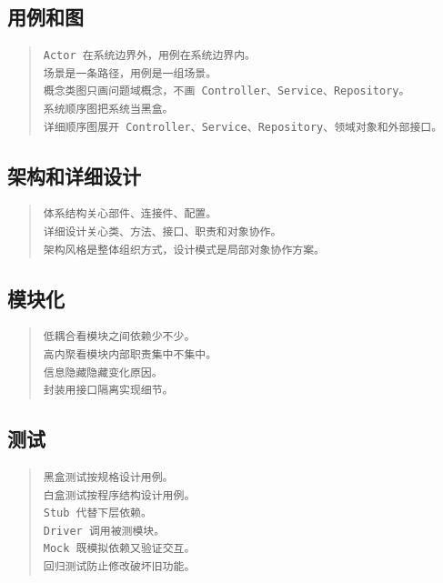 \documentclass[UTF8,zihao=-4]{ctexart}
\begin{document}
\subsection{用例和图}


\begin{quote}
\footnotesize
\begin{verbatim}
Actor 在系统边界外，用例在系统边界内。
场景是一条路径，用例是一组场景。
概念类图只画问题域概念，不画 Controller、Service、Repository。
系统顺序图把系统当黑盒。
详细顺序图展开 Controller、Service、Repository、领域对象和外部接口。
\end{verbatim}
\end{quote}


\subsection{架构和详细设计}


\begin{quote}
\footnotesize
\begin{verbatim}
体系结构关心部件、连接件、配置。
详细设计关心类、方法、接口、职责和对象协作。
架构风格是整体组织方式，设计模式是局部对象协作方案。
\end{verbatim}
\end{quote}


\subsection{模块化}


\begin{quote}
\footnotesize
\begin{verbatim}
低耦合看模块之间依赖少不少。
高内聚看模块内部职责集中不集中。
信息隐藏隐藏变化原因。
封装用接口隔离实现细节。
\end{verbatim}
\end{quote}


\subsection{测试}


\begin{quote}
\footnotesize
\begin{verbatim}
黑盒测试按规格设计用例。
白盒测试按程序结构设计用例。
Stub 代替下层依赖。
Driver 调用被测模块。
Mock 既模拟依赖又验证交互。
回归测试防止修改破坏旧功能。
\end{verbatim}
\end{quote}
\end{document}
